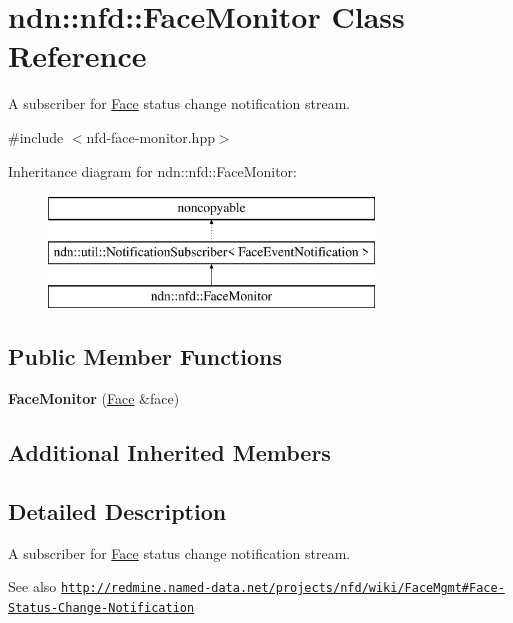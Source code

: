 \hypertarget{classndn_1_1nfd_1_1FaceMonitor}{}\section{ndn\+:\+:nfd\+:\+:Face\+Monitor Class Reference}
\label{classndn_1_1nfd_1_1FaceMonitor}


A subscriber for \hyperlink{classndn_1_1Face}{Face} status change notification stream.  




{\ttfamily \#include $<$nfd-\/face-\/monitor.\+hpp$>$}

Inheritance diagram for ndn\+:\+:nfd\+:\+:Face\+Monitor\+:\begin{figure}[H]
\begin{center}
\leavevmode
\includegraphics[height=3.000000cm]{classndn_1_1nfd_1_1FaceMonitor}
\end{center}
\end{figure}
\subsection*{Public Member Functions}
\begin{DoxyCompactItemize}
\item 
{\bfseries Face\+Monitor} (\hyperlink{classndn_1_1Face}{Face} \&face)\hypertarget{classndn_1_1nfd_1_1FaceMonitor_aed58381382304c8dbc73a4d5d1b1e99b}{}\label{classndn_1_1nfd_1_1FaceMonitor_aed58381382304c8dbc73a4d5d1b1e99b}

\end{DoxyCompactItemize}
\subsection*{Additional Inherited Members}


\subsection{Detailed Description}
A subscriber for \hyperlink{classndn_1_1Face}{Face} status change notification stream. 

\begin{DoxySeeAlso}{See also}
\href{http://redmine.named-data.net/projects/nfd/wiki/FaceMgmt#Face-Status-Change-Notification}{\tt http\+://redmine.\+named-\/data.\+net/projects/nfd/wiki/\+Face\+Mgmt\#\+Face-\/\+Status-\/\+Change-\/\+Notification} 
\end{DoxySeeAlso}


